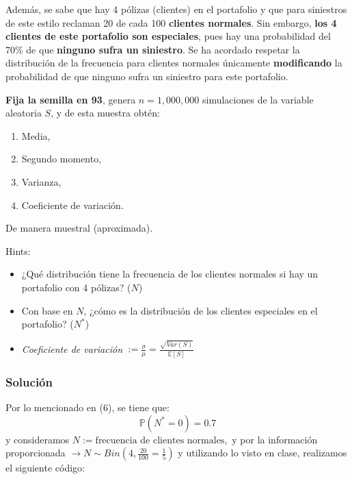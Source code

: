 \documentclass[
]{article}
\begin{document}
Además, se sabe que hay 4 pólizas (clientes) en el portafolio y que para
siniestros de este estilo reclaman 20 de cada 100 \textbf{clientes
normales}. Sin embargo, \textbf{los 4 clientes de este portafolio son
especiales}, pues hay una probabilidad del 70\% de que \textbf{ninguno
sufra un siniestro}. Se ha acordado respetar la distribución de la
frecuencia para clientes normales únicamente \textbf{modificando} la
probabilidad de que ninguno sufra un siniestro para este portafolio.

\textbf{Fija la semilla en 93}, genera \(n=1,000,000\) simulaciones de
la variable aleatoria \(S\), y de esta muestra obtén:

\begin{enumerate}[label=(\alph*)]
\item Media,
\item Segundo momento,
\item Varianza,
\item Coeficiente de variación.
\end{enumerate}

De manera muestral (aproximada).

Hints:

\begin{itemize}
\item
  ¿Qué distribución tiene la frecuencia de los clientes normales si hay
  un portafolio con 4 pólizas? (\(N\))
\item
  Con base en \(N\), ¿cómo es la distribución de los clientes especiales
  en el portafolio? (\(N^*\))
\item
  \emph{Coeficiente de variación}
  \(:= \frac{\sigma}{\mu} = \frac{\sqrt{Var(S)}}{\mathbb{E}[S]}\)
\end{itemize}

\hypertarget{soluciuxf3n-5}{%
\subsubsection{Solución}\label{soluciuxf3n-5}}

Por lo mencionado en (6), se tiene que: \[\mathbb{P}(N^{*} = 0) = 0.7\]
y consideramos \(N:= \text{frecuencia de clientes normales},\) y por la
información proporcionada
\(\rightarrow N \sim Bin(4, \frac{20}{100}=\frac{1}{5})\) y utilizando
lo visto en clase, realizamos el siguiente código:
\end{document}
